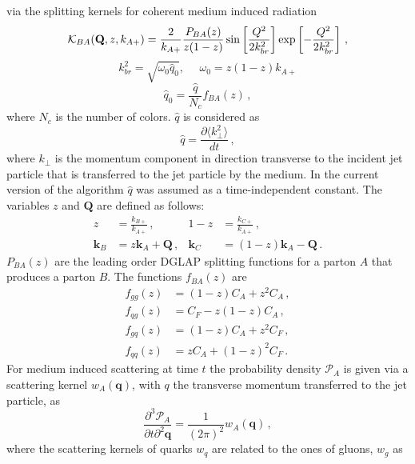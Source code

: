 \documentclass[preprint,12pt]{elsarticle}
\begin{document}
via the splitting kernels for coherent medium induced radiation 
%
\begin{equation}
{\cal K}_{BA}(\mathbf{Q},z,k_{A+})=\frac{2}{k_{A+}}\frac{P_{BA}(z)}{z(1-z)}\sin\left[\frac{Q^2}{2k_{br}^2}\right]\exp\left[-\frac{Q^2}{2k_{br}^2}\right] \,,
\label{eq:Kqz}
\end{equation}
\begin{equation}
k_{br}^2=\sqrt{\omega_0\hat q_0},\,\,\,\,\,\,\,\, \omega_0=z(1-z)k_{A+}
\end{equation}
\begin{equation}
\hat q_0=\frac{\hat q}{N_c} f_{BA}(z)\,,  
\end{equation}
%
where $N_c$ is the number of colors. $\hat q$ is considered as
%
\begin{equation}
\hat{q}=\frac{\partial \langle k_\perp^2 \rangle}{dt}\,,
\end{equation} 
%
where $k_\perp$ is the momentum component in direction transverse to the incident jet particle that is transferred to the jet particle by the medium. In the current version of the algorithm $\hat{q}$ was assumed as a time-independent constant.
The variables $z$ and $\mathbf{Q}$ are defined as follows:
\begin{align}
    z&=\frac{k_{B+}}{k_{A+}}\,,&1-z&=\frac{k_{C+}}{k_{A+}}\,,\\
    \mathbf{k}_{B}&=z\mathbf{k}_{A}+\mathbf{Q}\,,&\mathbf{k}_{C}&=(1-z)\mathbf{k}_{A}-\mathbf{Q}\,.
\end{align}
$P_{BA}(z)$ are the leading order DGLAP splitting functions for a parton $A$ that produces a parton $B$.
The functions $f_{BA}(z)$ are 
%
\begin{align}
    f_{gg}(z) &= (1-z) C_A + z^2 C_A \,, \\
    f_{qg}(z) &= C_F - z(1-z) C_A \,,\\
    f_{gq}(z) &= (1-z) C_A + z^2 C_F \,,\\
    f_{qq}(z) &= z C_A + (1-z)^2 C_F \,.
\end{align}
%
For medium induced scattering at time $t$ the probability density $\mathcal{P}_{A}$ is given via a scattering kernel $w_A(\mathbf{q})$, with $q$ the transverse momentum transferred to the jet particle, as
\begin{equation}
    \frac{\partial^3 \mathcal{P}_{A}}{\partial t \partial^2 \mathbf{q}}=\frac{1}{(2\pi)^2}w_A(\mathbf{q})\,,
    \label{eq:scatkerneldef}
\end{equation}
where the scattering kernels of quarks $w_q$ are related to the ones of gluons, $w_g$ as
\end{document}
